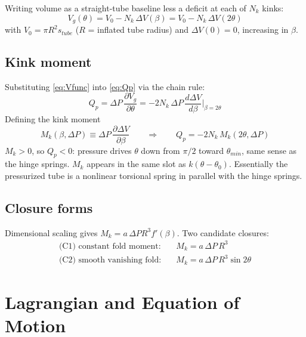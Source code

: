 \documentclass[11pt]{article}
\newcommand{\Vg}{V_g}                 %
\newcommand{\DP}{\Delta P}
\newcommand{\Mk}{M_k}
\begin{document}
Writing volume as a straight-tube baseline less a deficit at each of $N_k$ kinks:
\begin{equation}
\Vg(\theta) = V_0 - N_k\,\Delta V(\beta) = V_0 - N_k\,\Delta V(2\theta)
\label{eq:Vfunc}
\end{equation}
with $V_0 = \pi R^2 s_{tube}$ ($R$ = inflated tube radius) and $\Delta V(0)=0$, increasing in $\beta$.

\subsection*{Kink moment}

Substituting \eqref{eq:Vfunc} into \eqref{eq:Qp} via the chain rule:
\begin{equation}
Q_p = \DP\,\frac{\partial \Vg}{\partial\theta}
= -2N_k\,\DP\,\frac{d\Delta V}{d\beta}\bigg|_{\beta=2\theta}
\end{equation}
Defining the kink moment
\begin{equation}
\Mk(\beta,\DP) \equiv \DP\,\frac{\partial \Delta V}{\partial\beta}
\qquad\Longrightarrow\qquad
\boxed{Q_p = -2N_k\,\Mk(2\theta,\DP)}
\label{eq:Qp_final}
\end{equation}
$\Mk>0$, so $Q_p<0$: pressure drives $\theta$ down from $\pi/2$ toward $\theta_{min}$, same sense
as the hinge springs. $\Mk$ appears in the same slot as $k(\theta-\theta_0)$. Essentially the pressurized tube
is a nonlinear torsional spring in parallel with the hinge springs.

\subsection*{Closure forms}

Dimensional scaling gives $\Mk = a\,\DP R^3 f'(\beta)$. Two candidate closures:
\begin{align}
\text{(C1) constant fold moment:}\quad & \Mk = a\,\DP\,R^{3} \\
\text{(C2) smooth vanishing fold:}\quad & \Mk = a\,\DP\,R^{3}\sin 2\theta
\end{align}

\section{Lagrangian and Equation of Motion}
\end{document}
